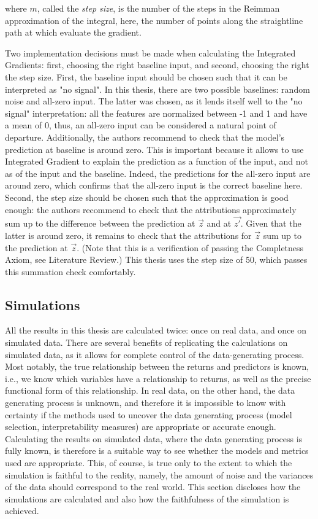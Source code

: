 			where $m$, called the \textit{step size}, is the number of the steps in the Reimman approximation of the integral, here, the number of points along the straightline path at which evaluate the gradient. 
			
			Two implementation decisions must be made when calculating the Integrated Gradients: first, choosing the right baseline input, and second, choosing the right the step size. First, the baseline input should be chosen such that it can be interpreted as "no signal". In this thesis, there are two possible baselines: random noise and all-zero input. The latter was chosen, as it lends itself well to the "no signal" interpretation: all the features are normalized between -1 and 1 and have a mean of 0, thus, an all-zero input can be considered a natural point of departure. Additionally, the authors recommend to check that the model's prediction at baseline is around zero. This is important because it allows to use Integrated Gradient to explain the prediction as a function of the input, and not as of the input and the baseline. Indeed, the predictions for the all-zero input are around zero, which confirms that the all-zero input is the correct baseline here. Second, the step size should be chosen such that the approximation is good enough: the authors recommend to check that the attributions approximately sum up to the difference between the prediction at $\vec{z}$ and at $\vec{z'}$. Given that the latter is around zero, it remains to check that the attributions for $\vec{z}$ sum up to the prediction at $\vec{z}$. (Note that this is a verification of passing the Completness Axiom, see Literature Review.) This thesis uses the step size of 50, which passes this summation check comfortably.  
		
	\subsection{Simulations}
		All the results in this thesis are calculated twice: once on real data, and once on simulated data. There are several benefits of replicating the calculations on simulated data, as it allows for complete control of the data-generating process. Most notably, the true relationship between the returns and predictors is known, i.e., we know which variables have a relationship to returns, as well as the precise functional form of this relationship. In real data, on the other hand, the data generating process is unknown, and therefore it is impossible to know with certainty if the methods used to uncover the data generating process (model selection, interpretability measures) are appropriate or accurate enough. Calculating the results on simulated data, where the data generating process is fully known, is therefore is a suitable way to see whether the models and metrics used are appropriate. This, of course, is true only to the extent to which the simulation is faithful to the reality, namely, the amount of noise and the variances of the data should correspond to the real world. This section discloses how the simulations are calculated and also how the faithfulness of the simulation is achieved. 
		
